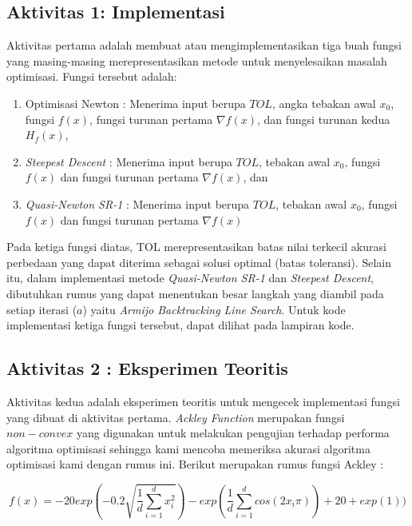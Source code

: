 \documentclass[11pt]{article}
\begin{document}
\subsection{Aktivitas 1: Implementasi}

\medskip

Aktivitas pertama adalah membuat atau mengimplementasikan tiga buah fungsi yang masing-masing merepresentasikan metode untuk menyelesaikan masalah optimisasi. Fungsi tersebut adalah:

\begin{enumerate}
    \item Optimisasi Newton : Menerima input berupa $TOL$, angka tebakan awal $x_{0}$, fungsi $f(x)$, fungsi turunan pertama $∇f(x)$, dan fungsi turunan kedua $H_{f}(x)$,
    \item \textit{Steepest Descent} : Menerima input berupa $TOL$, tebakan awal $x_{0}$, fungsi $f(x)$ dan fungsi turunan pertama $∇f(x)$, dan
    \item \textit{Quasi-Newton SR-1} : Menerima input berupa $TOL$, tebakan awal $x_{0}$, fungsi $f(x)$ dan fungsi turunan pertama $∇f(x)$
\end{enumerate}

\medskip

Pada ketiga fungsi diatas, TOL merepresentasikan batas nilai terkecil akurasi perbedaan yang dapat diterima sebagai solusi optimal (batas toleransi). Selain itu, dalam implementasi metode \textit{Quasi-Newton SR-1} dan \textit{Steepest Descent}, dibutuhkan rumus yang dapat menentukan besar langkah yang diambil pada setiap iterasi ($a$) yaitu \textit{Armijo Backtracking Line Search}. Untuk kode implementasi ketiga fungsi tersebut, dapat dilihat pada lampiran kode.

\subsection{Aktivitas 2 : Eksperimen Teoritis}

\medskip

Aktivitas kedua adalah eksperimen teoritis untuk mengecek implementasi fungsi yang dibuat di aktivitas pertama. \textit{Ackley Function} merupakan fungsi $non-convex$ yang digunakan untuk melakukan pengujian terhadap performa algoritma optimisasi sehingga kami mencoba memeriksa akurasi algoritma optimisasi kami dengan rumus ini. Berikut merupakan rumus fungsi Ackley :

\medskip

\[
f(x) =  - 20exp(-0.2\sqrt{\frac{1}{d} \sum_{i=1}^{d} x_{i}^{2}} ) - exp(\frac{1}{d}\sum_{i=1}^{d}cos(2x_{i}\pi)) + 20 + exp(1))
\]
\end{document}
